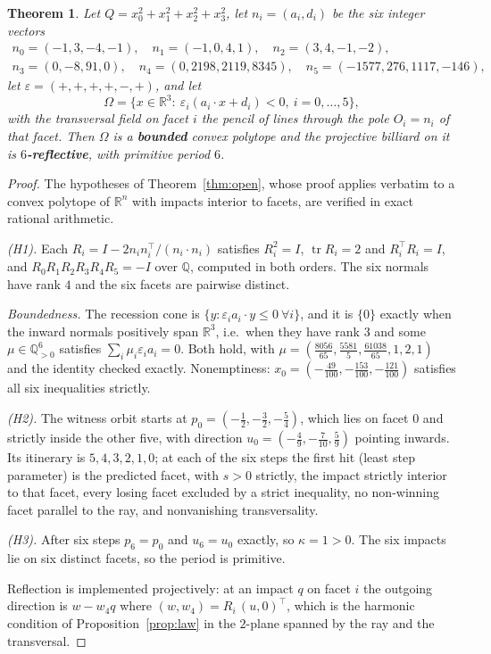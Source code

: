 \documentclass[11pt,a4paper]{article}
\theoremstyle{plain}
\newtheorem{theorem}{Theorem}[section]
\theoremstyle{definition}
\theoremstyle{remark}
\newcommand{\tr}{\operatorname{tr}}
\begin{document}
\begin{theorem}\label{thm:rp3example}
Let $Q=x_0^2+x_1^2+x_2^2+x_3^2$, let $n_i=(a_i,d_i)$ be the six integer vectors
\[
\begin{gathered}
 n_0=(-1,3,-4,-1),\quad n_1=(-1,0,4,1),\quad n_2=(3,4,-1,-2),\\
 n_3=(0,-8,91,0),\quad n_4=(0,2198,2119,8345),\quad n_5=(-1577,276,1117,-146),
\end{gathered}
\]
let $\varepsilon=(+,+,+,+,-,+)$, and let
\[
  \Omega=\{x\in\mathbb{R}^3:\ \varepsilon_i(a_i\cdot x+d_i)<0,\ i=0,\dots,5\},
\]
with the transversal field on facet $i$ the pencil of lines through the pole
$O_i=n_i$ of that facet. Then $\Omega$ is a \textbf{bounded} convex polytope and
the projective billiard on it is \textbf{$6$-reflective}, with primitive period
$6$.
\end{theorem}

\begin{proof}
The hypotheses of Theorem~\ref{thm:open}, whose proof applies verbatim to a convex
polytope of $\mathbb{R}^n$ with impacts interior to facets, are verified in exact
rational arithmetic.

\emph{\textup{(H1)}.} Each $R_i=I-2n_in_i^\top/(n_i\!\cdot\!n_i)$ satisfies
$R_i^2=I$, $\tr R_i=2$ and $R_i^\top R_i=I$, and
$R_0R_1R_2R_3R_4R_5=-I$ over $\mathbb{Q}$, computed in both orders. The six normals
have rank $4$ and the six facets are pairwise distinct.

\emph{Boundedness.} The recession cone is $\{y:\varepsilon_ia_i\cdot y\le0\ \forall
i\}$, and it is $\{0\}$ exactly when the inward normals positively span
$\mathbb{R}^3$, i.e.\ when they have rank $3$ and some $\mu\in\mathbb{Q}^6_{>0}$
satisfies $\sum_i\mu_i\varepsilon_ia_i=0$. Both hold, with
$\mu=(\tfrac{8056}{65},\tfrac{5581}5,\tfrac{61038}{65},1,2,1)$ and the identity
checked exactly. Nonemptiness: $x_0=(-\tfrac{49}{100},-\tfrac{153}{100},
-\tfrac{121}{100})$ satisfies all six inequalities strictly.

\emph{\textup{(H2)}.} The witness orbit starts at
$p_0=(-\tfrac12,-\tfrac32,-\tfrac54)$, which lies on facet $0$ and strictly inside
the other five, with direction $u_0=(-\tfrac49,-\tfrac7{10},\tfrac59)$ pointing
inwards. Its itinerary is $5,4,3,2,1,0$; at each of the six steps the first hit
(least step parameter) is the predicted facet, with $s>0$ strictly, the impact
strictly interior to that facet, every losing facet excluded by a strict
inequality, no non-winning facet parallel to the ray, and nonvanishing
transversality.

\emph{\textup{(H3)}.} After six steps $p_6=p_0$ and $u_6=u_0$ exactly, so
$\kappa=1>0$. The six impacts lie on six distinct facets, so the period is
primitive.

Reflection is implemented projectively: at an impact $q$ on facet $i$ the outgoing
direction is $w-w_4q$ where $(w,w_4)=R_i\,(u,0)^\top$, which is the harmonic
condition of Proposition~\ref{prop:law} in the $2$-plane spanned by the ray and the
transversal.
\end{proof}
\end{document}
